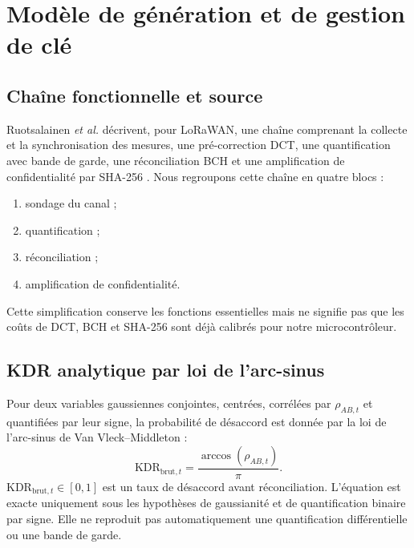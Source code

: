 \documentclass[conference,a4paper]{IEEEtran}
\newcommand{\KDR}{\mathrm{KDR}}
\begin{document}
\section{Modèle de génération et de gestion de clé}
\label{sec:key-management}

\subsection{Chaîne fonctionnelle et source}
Ruotsalainen \emph{et al.} décrivent, pour LoRaWAN, une chaîne comprenant la collecte et la synchronisation des mesures, une pré-correction DCT, une quantification avec bande de garde, une réconciliation BCH et une amplification de confidentialité par SHA-256 \cite[Sec.~III-A, Eqs.~(7)--(8)]{ruotsalainen2020}. Nous regroupons cette chaîne en quatre blocs :
\begin{enumerate}
    \item sondage du canal ;
    \item quantification ;
    \item réconciliation ;
    \item amplification de confidentialité.
\end{enumerate}
Cette simplification conserve les fonctions essentielles mais ne signifie pas que les coûts de DCT, BCH et SHA-256 sont déjà calibrés pour notre microcontrôleur.

\subsection{KDR analytique par loi de l'arc-sinus}
Pour deux variables gaussiennes conjointes, centrées, corrélées par $\rho_{AB,t}$ et quantifiées par leur signe, la probabilité de désaccord est donnée par la loi de l'arc-sinus de Van Vleck--Middleton \cite{vanvleck1966} :
\begin{equation}
    \KDR_{\mathrm{brut},t}=\frac{\arccos(\rho_{AB,t})}{\pi}.
    \label{eq:kdr-arcsine}
\end{equation}
$\KDR_{\mathrm{brut},t}\in[0,1]$ est un taux de désaccord avant réconciliation. L'équation est exacte uniquement sous les hypothèses de gaussianité et de quantification binaire par signe. Elle ne reproduit pas automatiquement une quantification différentielle ou une bande de garde.
\end{document}
